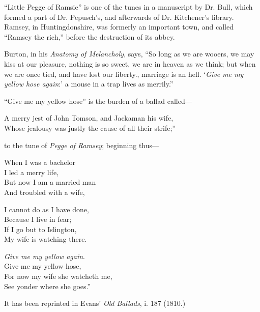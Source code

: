 “Little Pegge of Ramsie” is one of the tunes in a manuscript by Dr. Bull, which
formed a part of Dr. Pepusch’s, and afterwards of Dr. Kitchener’s library. Ramsey,
in Huntingdonshire, was formerly an important town, and called “Ramsey the
rich,” before the destruction of its abbey.

Burton, in his \textit{Anatomy of Melancholy}, says, “So long as we are wooers, we
may kiss at our pleasure, nothing is so sweet, we are in heaven as we think; but
when we are once tied, and have lost our liberty., marriage is an hell. ‘\textit{Give me
my yellow hose again}:’ a mouse in a trap lives as merrily.”

“Give me my yellow hose” is the burden of a ballad called—
\settowidth{\versewidth}{A merry jest of John Tomson, and Jackaman his wife,}
\begin{scverse}
A merry jest of John Tomson, and Jackaman his wife,\\
Whose jealousy was justly the cause of all their strife;”
\end{scverse}
to the tune of \textit{Pegge of Ramsey}; beginning thus—

\settowidth{\versewidth}{But now I am a married man}
\begin{dcverse}
\begin{altverse}
When I was a bachelor\\
I led a merry life,\\
But now I am a married man\\
And troubled with a wife,

I cannot do as I have done,\\
Because I live in fear;\\
If I go but to Islington,\\
My wife is watching there.
\end{altverse}
\end{dcverse}

\settowidth{\versewidth}{For now my wife she watcheth me,}
\begin{scverse}
\begin{altverse}
\textit{Give me my yellow again}.\\
Give me my yellow hose,\\
For now my wife she watcheth me,\\
See yonder where she goes.”
\end{altverse}
\end{scverse}
It has been reprinted in Evans’ \textit{Old Ballads}, i. 187 (1810.)

